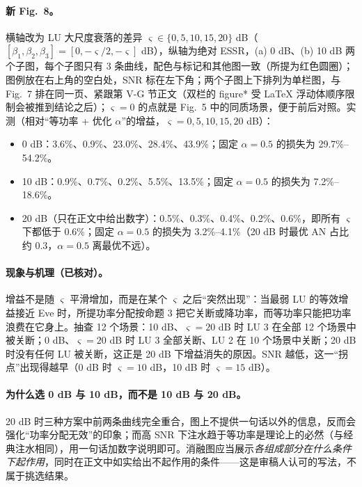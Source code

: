 \documentclass[11pt,a4paper]{ctexart}
\begin{document}
\paragraph{新 Fig.~8。}横轴改为 LU 大尺度衰落的差异 $\varsigma\in\{0,5,10,15,20\}$ dB（$[\beta_1,\beta_2,\beta_3]=[0,-\varsigma/2,-\varsigma]$ dB），纵轴为绝对 ESSR，(a) 0 dB、(b) 10 dB 两个子图，每个子图只有 3 条曲线，配色与标记和其他图一致（所提为红色圆圈）；图例放在右上角的空白处，SNR 标在左下角；两个子图上下排列为单栏图，与 Fig.~7 排在同一页、紧跟第 V-G 节正文（双栏的 figure* 受 \LaTeX{} 浮动体顺序限制会被推到结论之后）；$\varsigma=0$ 的点就是 Fig.~5 中的同质场景，便于前后对照。实测（相对“等功率 + 优化 $\alpha$”的增益，$\varsigma=0,5,10,15,20$ dB）：
\begin{itemize}
\item 0 dB：3.6\%、0.9\%、23.0\%、28.4\%、43.9\%；固定 $\alpha=0.5$ 的损失为 29.7\%--54.2\%。
\item 10 dB：0.9\%、0.7\%、0.2\%、5.5\%、13.5\%；固定 $\alpha=0.5$ 的损失为 7.2\%--18.6\%。
\item 20 dB（只在正文中给出数字）：0.5\%、0.3\%、0.4\%、0.2\%、0.6\%，即所有 $\varsigma$ 下都低于 0.6\%；固定 $\alpha=0.5$ 的损失为 3.2\%--4.1\%（20 dB 时最优 AN 占比约 0.3，$\alpha=0.5$ 离最优不远）。
\end{itemize}
\paragraph{现象与机理（已核对）。}增益不是随 $\varsigma$ 平滑增加，而是在某个 $\varsigma$ 之后“突然出现”：当最弱 LU 的等效增益接近 Eve 时，所提功率分配按命题 3 把它关断或降功率，而等功率只能把功率浪费在它身上。抽查 12 个场景：10 dB、$\varsigma=20$ dB 时 LU 3 在全部 12 个场景中被关断；0 dB、$\varsigma=20$ dB 时 LU 3 全部关断、LU 2 在 10 个场景中关断；20 dB 时没有任何 LU 被关断，这正是 20 dB 下增益消失的原因。SNR 越低，这一“拐点”出现得越早（0 dB 时 $\varsigma=10$ dB，10 dB 时 $\varsigma=15$ dB）。

\paragraph{为什么选 0 dB 与 10 dB，而不是 10 dB 与 20 dB。}20 dB 时三种方案中前两条曲线完全重合，图上不提供一句话以外的信息，反而会强化“功率分配无效”的印象；而高 SNR 下注水趋于等功率是理论上的必然（与经典注水相同），用一句话加数字说明即可。消融图应当展示\emph{各组成部分在什么条件下起作用}，同时在正文中如实给出不起作用的条件——这是审稿人认可的写法，不属于挑选结果。
\end{document}
